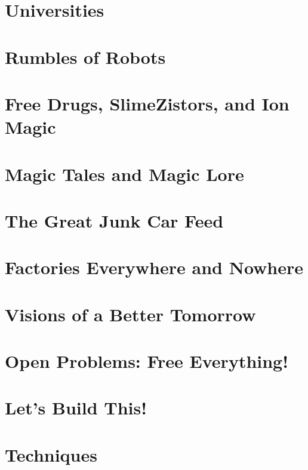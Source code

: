 \documentclass[ebook,12pt,openany]{memoir} %
\begin{document}
\chapter{Universities}


\chapter{Rumbles of Robots}


\chapter{Free Drugs, SlimeZistors, and Ion Magic}


\chapter{Magic Tales and Magic Lore}


\chapter{The Great Junk Car Feed}


\chapter{Factories Everywhere and Nowhere}


\chapter{Visions of a Better Tomorrow}


\chapter{Open Problems: Free Everything!}


\chapter{Let's Build This!}


\chapter{Techniques}

\end{document}
